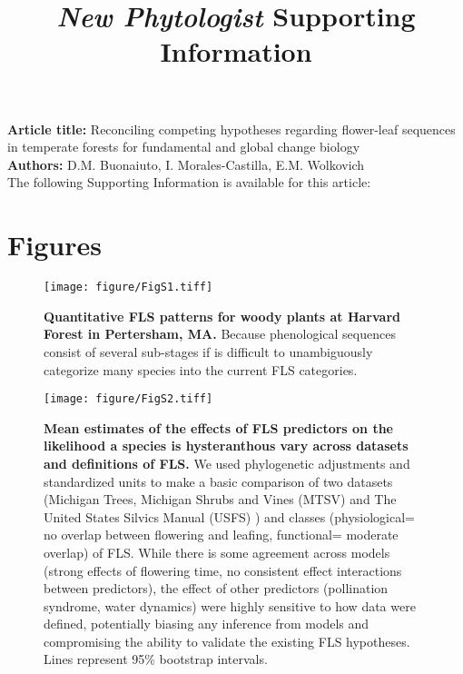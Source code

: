 \documentclass[11pt]{article}\usepackage[]{graphicx}\usepackage[]{color}
\title{\textit{New Phytologist} Supporting Information}
\date{}
\begin{document}
\maketitle

\noindent \textbf{Article title:} Reconciling competing hypotheses regarding flower-leaf sequences in temperate forests for fundamental and global change biology\\
\noindent \textbf{Authors:} D.M. Buonaiuto, I. Morales-Castilla, E.M. Wolkovich\\

\noindent The following Supporting Information is available for this article:\\


\section*{Figures}


\begin{figure}[H]
    \centering
 \texttt{[image: figure/FigS1.tiff]} 
    \caption{\textbf{Quantitative FLS patterns for woody plants at Harvard Forest in Pertersham, MA.} Because phenological sequences consist of several sub-stages if is difficult to unambiguously categorize many species into the current FLS categories. }
    \label{fig:HFmeans}
\end{figure}

\begin{figure}[H]
    \centering
 \texttt{[image: figure/FigS2.tiff]} 
    \caption{\textbf{Mean estimates of the effects of FLS predictors on the likelihood a species is hysteranthous vary across datasets and definitions of FLS.}  We used phylogenetic adjustments and standardized units to make a basic comparison of two datasets (Michigan Trees, Michigan Shrubs and Vines (MTSV) \citep{Barnes2004,Barnes2016} and The United States Silvics Manual (USFS) \citep{Burns1990}) and classes (physiological= no overlap between flowering and leafing, functional= moderate overlap) of FLS. While there is some agreement across models (strong effects of flowering time, no consistent effect interactions between predictors), the effect of other predictors (pollination syndrome, water dynamics) were highly sensitive to how data were defined, potentially biasing any inference from models and compromising the ability to validate the existing FLS hypotheses. Lines represent 95\% bootstrap intervals.}
    \label{fig:muplots.USMT}
\end{figure}
\end{document}
